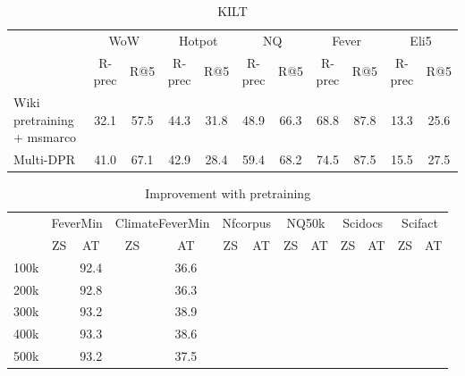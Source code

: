 \begin{table}[h!]
\centering
\begin{tabular}{l|cccccccccc} 
 \toprule
 & \multicolumn{2}{c}{WoW
} & \multicolumn{2}{c}{Hotpot} & \multicolumn{2}{c}{NQ} & \multicolumn{2}{c}{Fever} & \multicolumn{2}{c}{Eli5}  \\
& R-prec & R@5 & R-prec & R@5 & R-prec & R@5 & R-prec & R@5 & R-prec & R@5\\ \midrule
Wiki pretraining + msmarco & 32.1 & 57.5 & 44.3 & 31.8 & 48.9 & 66.3 & 68.8 & 87.8 & 13.3 & 25.6 \\
Multi-DPR & 41.0 & 67.1 & 42.9 & 28.4 & 59.4 & 68.2 & 74.5 & 87.5 & 15.5 & 27.5 \\
 \bottomrule
\end{tabular}
\caption{KILT}
\label{tab:kilt}
\end{table}


\begin{table}[h!]
\centering
\begin{tabular}{l|cccccccccccc} 
 \toprule
 & \multicolumn{2}{c}{FeverMin
} & \multicolumn{2}{c}{ClimateFeverMin} & \multicolumn{2}{c}{Nfcorpus} & \multicolumn{2}{c}{NQ50k} & \multicolumn{2}{c}{Scidocs} & \multicolumn{2}{c}{Scifact}  \\
& ZS & AT & ZS & AT & ZS & AT & ZS & AT & ZS & AT & ZS & AT \\ \midrule
100k & & 92.4 & & 36.6 & & \\
200k & & 92.8 & & 36.3 & & \\
300k & & 93.2 & & 38.9 & & \\
400k & & 93.3 & & 38.6 & & \\
500k & & 93.2 & & 37.5 & & \\
 \bottomrule
\end{tabular}
\caption{Improvement with pretraining}
\label{tab:improvement}
\end{table}


